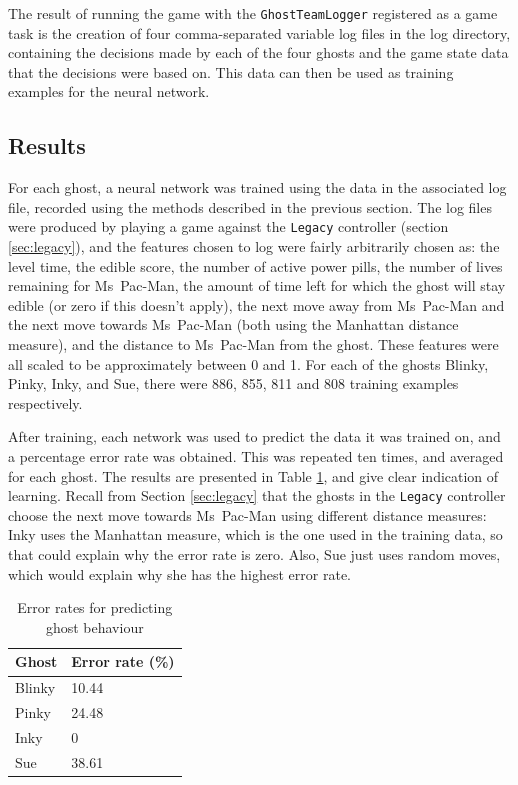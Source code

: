 The result of running the game with the {\tt GhostTeamLogger} registered as a game task is the creation of four comma-separated variable log files in the log directory, containing the decisions made by each of the four ghosts and the game state data that the decisions were based on.  This data can then be used as training examples for the neural network.

\subsection{Results}
\label{sec:conceptresults}

For each ghost, a neural network was trained using the data in the associated log file, recorded using the methods described in the previous section.  The log files were produced by playing a game against the {\tt Legacy} controller (section \ref{sec:legacy}), and the features chosen to log were fairly arbitrarily chosen as: the level time, the edible score, the number of active power pills, the number of lives remaining for Ms~Pac-Man, the amount of time left for which the ghost will stay edible (or zero if this doesn't apply), the next move away from Ms~Pac-Man and the next move towards Ms~Pac-Man (both using the Manhattan distance measure), and the distance to Ms~Pac-Man from the ghost.  These features were all scaled to be approximately between 0 and 1.  For each of the ghosts Blinky, Pinky, Inky, and Sue, there were 886, 855, 811 and 808 training examples respectively.

After training, each network was used to predict the data it was trained on, and a percentage error rate was obtained.  This was repeated ten times, and averaged for each ghost.  The results are presented in Table \ref{tab:proofconcept}, and give clear indication of learning.  Recall from Section \ref{sec:legacy} that the ghosts in the {\tt Legacy} controller choose the next move towards Ms~Pac-Man using different distance measures: Inky uses the Manhattan measure, which is the one used in the training data, so that could explain why the error rate is zero.  Also, Sue just uses random moves, which would explain why she has the highest error rate.

\begin{table}[ht]
\centering
\begin{tabular}{ll}
\toprule
Ghost & Error rate (\%) \\
\midrule
Blinky & 10.44 \\
Pinky & 24.48 \\
Inky & 0 \\
Sue & 38.61 \\
\bottomrule
\end{tabular}
\caption{Error rates for predicting ghost behaviour}
\label{tab:proofconcept}
\end{table}

